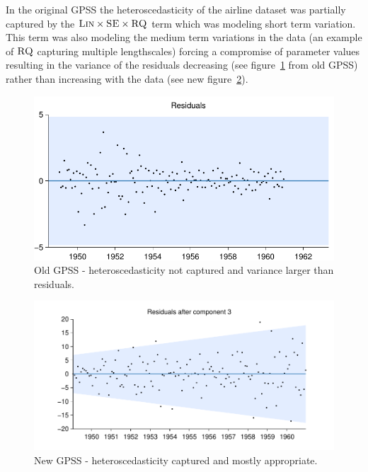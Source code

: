 \documentclass{article}
\begin{document}
In the original GPSS the heteroscedasticity of the airline dataset was partially captured by the ${\textsc{Lin}} \times {\textsc{SE}} \times {\textsc{RQ}}$ term which was modeling short term variation.
This term was also modeling the medium term variations in the data (an example of ${\textsc{RQ}}$ capturing multiple lengthscales) forcing a compromise of parameter values resulting in the variance of the residuals decreasing (see figure~\ref{fig:not_hetero} from old GPSS) rather than increasing with the data (see new figure~\ref{fig:hetero}).

\begin{figure}[h]
\centering
\includegraphics[width=0.98\columnwidth]{figures/old-gpss/01-airline-months_resid}
\caption{Old GPSS - heteroscedasticity not captured and variance larger than residuals.}
\label{fig:not_hetero}
\end{figure}

\begin{figure}[h]
\centering
\includegraphics[width=0.98\columnwidth]{figures/01-airline/01-airline_3_anti_cum}
\caption{New GPSS - heteroscedasticity captured and mostly appropriate.}
\label{fig:hetero}
\end{figure}
\end{document}
